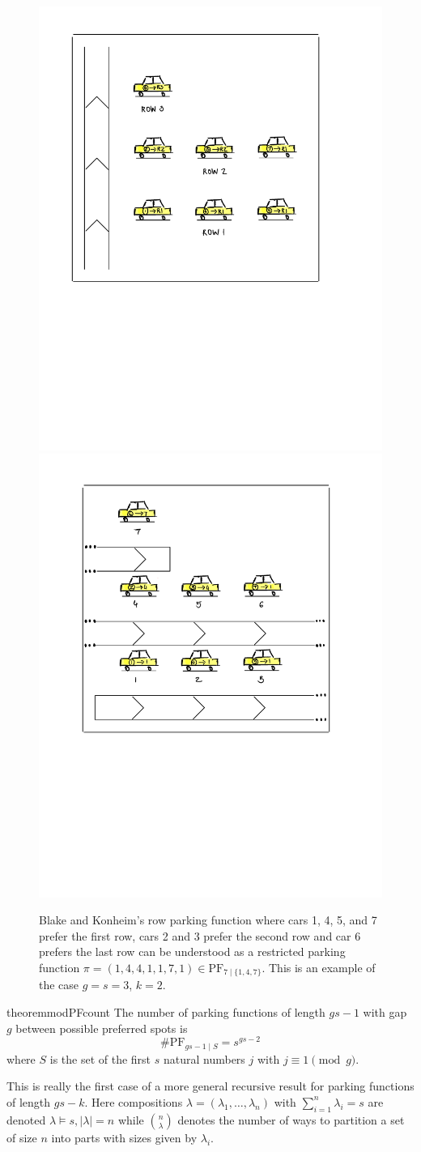 \documentclass[12 pt]{amsart}
\theoremstyle{definition} %
\theoremstyle{remark} %
\begin{document}
\begin{figure}[ht]
	\centering
	\includegraphics[width = 0.45 \textwidth]{figures/modPFs}
	\includegraphics[width = 0.45 \textwidth]{figures/modPFs2}
	\caption{Blake and Konheim's row parking function where cars 1, 4, 5, and 7 prefer the first row, cars 2 and 3 prefer the second row and car 6 prefers the last row can be understood as a restricted parking function $\pi = (1, 4, 4, 1, 1, 7, 1) \in \mathrm{PF}_{7 \mid \{ 1, 4, 7 \}}$. This is an example of the case $g = s = 3$, $k = 2$.}
\end{figure}

\begin{restatable}{theorem}{modPFcount}
	\label{thm:modPFcount}
	The number of parking functions of length $gs - 1$ with gap $g$ between possible preferred spots is
	\[
		\# \mathrm{PF}_{gs - 1 \mid S} = s^{gs - 2}
	\]
	where $S$ is the set of the first $s$ natural numbers $j$ with $j \equiv 1 \pmod g$.
\end{restatable}

This is really the first case of a more general recursive result for parking functions of length $gs - k$. Here compositions $\lambda = (\lambda_{1}, \dots, \lambda_{n})$ with $\sum_{i = 1}^{n} \lambda_{i} = s$ are denoted $\lambda\vDash s, \lvert\lambda\rvert = n$ while $\binom{n}{\lambda}$ denotes the number of ways to partition a set of size $n$ into parts with sizes given by $\lambda_i$.
\end{document}
